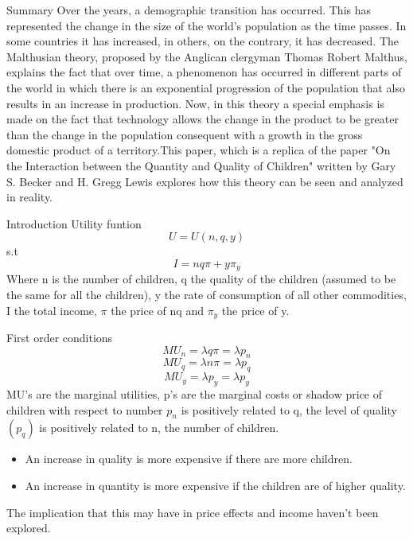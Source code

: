 \documentclass{beamer}
\begin{document}
\begin{frame}{Summary}
Over the years, a demographic transition has occurred. This has represented the change in the size of the world's population as the time passes. In some countries it has increased, in others, on the contrary, it has decreased. The Malthusian theory, proposed by the Anglican clergyman Thomas Robert Malthus, explains the fact that over time, a phenomenon has occurred in different parts of the world in which there is an exponential progression of the population that also results in an increase in production. Now, in this theory a special emphasis is made on the fact that technology allows the change in the product to be greater than the change in the population consequent with a growth in the gross domestic product of a territory.This paper, which is a replica of the paper "On the Interaction between the Quantity and Quality of Children" written by Gary S. Becker and H. Gregg Lewis explores how this theory can be seen and analyzed in reality.
\end{frame}

\begin{frame}{Introduction}
\alert {Utility funtion}
$$U = U(n, q, y)$$ s.t $$I=nq\pi+ y\pi_y$$ 
Where n is the number of children, q the quality of the children (assumed to be the same for all the children), y the rate of consumption of all other commodities, I the total income, $\pi$ the price of nq and $\pi_y$ the price of y.
\end{frame}

\begin{frame}
\alert {First order conditions}
$$MU_n = \lambda q \pi = \lambda p_n$$ 
$$MU_q = \lambda n \pi = \lambda p_q$$
$$MU_y = \lambda p_y = \lambda p_y$$
MU's are the marginal utilities, p's are the marginal costs or shadow price of children with respect to number $p_n$ is positively related to q, the level of quality $(p_q)$ is positively related to n, the number of children.   
\end{frame}

\begin{frame}
\begin{itemize}
\item {An increase in quality is more expensive if there are more children.}
\item {An increase in quantity is more expensive if the children are of higher quality.}
\end{itemize}
The implication that this may have in price effects and income haven't been explored. 
\end{frame}
\end{document}
